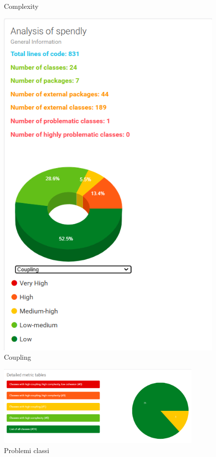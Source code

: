 \begin{figure}[H]
\begin{minipage}{0.45\textwidth}
        \caption{Complexity}
        \label{fig:Complexity_iterazione1}
    \end{minipage}
    \hfill
    \begin{minipage}{0.45\textwidth}
        \centering
        \includegraphics[width=\textwidth]{images/coupling_iter1.png}
        \caption{Coupling}
        \label{fig:Coupling_iterazione1}
    \end{minipage}
\end{figure}

\begin{figure}[H]
    \centering
    \includegraphics[width=0.9\textwidth]{images/Problem2_iter1.png}
    \caption{Problemi classi}
    \label{fig:Problemi_iterazione1}
\end{figure}

